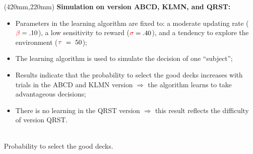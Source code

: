\documentclass[a0, portrait]{a0poster}
\newcommand{\tcr}[1]{\textcolor{Red}{#1}}
\begin{document}
\begin{textblock*}{340mm}(420mm,220mm)
{\bfseries Simulation on version ABCD, KLMN, and QRST:}
\begin{itemize}
\item Parameters in the learning algorithm are fixed to: a moderate updating rate ($\tcr{\beta} = .10$), a low sensitivity to reward ($\tcr{\sigma} = .40$), and a tendency to explore the environment ($\tcr{\tau}~=~50$);
\item The learning algorithm is used to simulate the decision of one ``subject'';
\item Results indicate that the probability to select the good decks increases with trials in the ABCD and KLMN version $\Rightarrow$ the algorithm learns to take advantageous decisions;
\item There is no learning in the QRST version $\Rightarrow$ this result reflects the difficulty of version QRST.
\end{itemize}
\begin{center}
 \\
\small Probability to select the good decks.
\end{center}
\end{textblock*}
\end{document}
